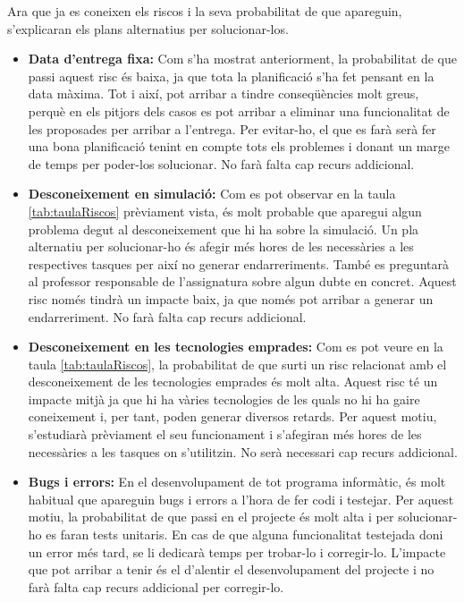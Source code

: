 \documentclass[a4paper]{article}
\begin{document}
Ara que ja es coneixen els riscos i la seva probabilitat de que apareguin, s'explicaran els plans alternatius per solucionar-los.
\begin{itemize}
    \item \textbf{Data d'entrega fixa:} Com s'ha mostrat anteriorment, la probabilitat de que passi aquest risc és baixa, ja que tota la planificació s'ha fet pensant en la data màxima. Tot i així, pot arribar a tindre conseqüències molt greus, perquè en els pitjors dels casos es pot arribar a eliminar una funcionalitat de les proposades per arribar a l'entrega. Per evitar-ho, el que es farà serà fer una bona planificació tenint en compte tots els problemes i donant un marge de temps per poder-los solucionar. No farà falta cap recurs addicional.
    \item \textbf{Desconeixement en simulació:} Com es pot observar en la taula \ref{tab:taulaRiscos} prèviament vista, és molt probable que aparegui algun problema degut al desconeixement que hi ha sobre la simulació. Un pla alternatiu per solucionar-ho és afegir més hores de les necessàries a les respectives tasques per així no generar endarreriments. També es preguntarà al professor responsable de l'assignatura sobre algun dubte en concret. Aquest risc només tindrà un impacte baix, ja que només pot arribar a generar un endarreriment. No farà falta cap recurs addicional.
    \item \textbf{Desconeixement en les tecnologies emprades:} Com es pot veure en la taula \ref{tab:taulaRiscos}, la probabilitat de que surti un risc relacionat amb el desconeixement de les tecnologies emprades és molt alta. Aquest risc té un impacte mitjà ja que hi ha vàries tecnologies de les quals no hi ha gaire coneixement i, per tant, poden generar diversos retards.  Per aquest motiu, s'estudiarà prèviament el seu funcionament i s'afegiran més hores de les necessàries a les tasques on s'utilitzin. No serà necessari cap recurs addicional.
    \item \textbf{Bugs i errors:} En el desenvolupament de tot programa informàtic, és molt habitual que apareguin bugs i errors a l'hora de fer codi i testejar. Per aquest motiu, la probabilitat de que passi en el projecte és molt alta i per solucionar-ho es faran tests unitaris. En cas de que alguna funcionalitat testejada doni un error més tard, se li dedicarà temps per trobar-lo i corregir-lo. L'impacte que pot arribar a tenir és el d'alentir el desenvolupament del projecte i no farà falta cap recurs addicional per corregir-lo.
\end{itemize}
\end{document}
